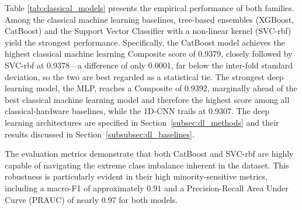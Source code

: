 \documentclass{ieeeaccess}
\begin{document}
Table \ref{tab:classical_models} presents the empirical performance of both families. Among the classical machine learning baselines, tree-based ensembles (XGBoost, CatBoost) and the Support Vector Classifier with a non-linear kernel (SVC-rbf) yield the strongest performance. Specifically, the CatBoost model achieves the highest classical machine learning Composite score of 0.9379, closely followed by SVC-rbf at 0.9378---a difference of only 0.0001, far below the inter-fold standard deviation, so the two are best regarded as a statistical tie. The strongest deep learning model, the MLP, reaches a Composite of 0.9392, marginally ahead of the best classical machine learning model and therefore the highest score among all classical-hardware baselines, while the 1D-CNN trails at 0.9307. The deep learning architectures are specified in Section~\ref{subsec:dl_methods} and their results discussed in Section~\ref{subsubsec:dl_baselines}.

The evaluation metrics demonstrate that both CatBoost and SVC-rbf are highly capable of navigating the extreme class imbalance inherent in the dataset. This robustness is particularly evident in their high minority-sensitive metrics, including a macro-F1 of approximately 0.91 and a Precision-Recall Area Under Curve (PRAUC) of nearly 0.97 for both models.

\begin{table}[htbp]
\caption{Performance Comparison of Classical and Deep Learning Models}
\label{tab:classical_models}
\centering
{}
\end{table}
\end{document}
